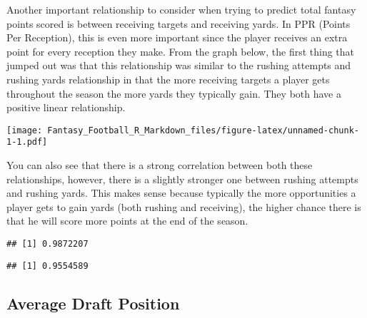 \documentclass[]{article}
\newenvironment{Shaded}{\begin{snugshade}}{\end{snugshade}}
\newcommand{\KeywordTok}[1]{\textcolor[rgb]{0.13,0.29,0.53}{\textbf{#1}}}
\newcommand{\DataTypeTok}[1]{\textcolor[rgb]{0.13,0.29,0.53}{#1}}
\newcommand{\StringTok}[1]{\textcolor[rgb]{0.31,0.60,0.02}{#1}}
\newcommand{\OperatorTok}[1]{\textcolor[rgb]{0.81,0.36,0.00}{\textbf{#1}}}
\newcommand{\NormalTok}[1]{#1}
\begin{document}
Another important relationship to consider when trying to predict total
fantasy points scored is between receiving targets and receiving yards.
In PPR (Points Per Reception), this is even more important since the
player receives an extra point for every reception they make. From the
graph below, the first thing that jumped out was that this relationship
was similar to the rushing attempts and rushing yards relationship in
that the more receiving targets a player gets throughout the season the
more yards they typically gain. They both have a positive linear
relationship.

\texttt{[image: Fantasy\_Football\_R\_Markdown\_files/figure-latex/unnamed-chunk-1-1.pdf]}

You can also see that there is a strong correlation between both these
relationships, however, there is a slightly stronger one between rushing
attempts and rushing yards. This makes sense because typically the more
opportunities a player gets to gain yards (both rushing and receiving),
the higher chance there is that he will score more points at the end of
the season.

\begin{Shaded}
\end{Shaded}

\begin{verbatim}
## [1] 0.9872207
\end{verbatim}

\begin{Shaded}
\end{Shaded}

\begin{verbatim}
## [1] 0.9554589
\end{verbatim}

\subsection{Average Draft Position}\label{average-draft-position}
\end{document}
